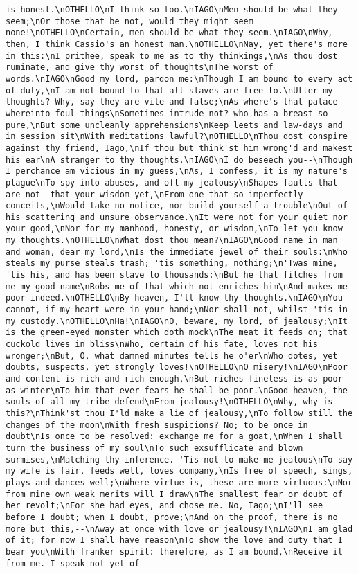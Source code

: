 \begin{verbatim}
is honest.\nOTHELLO\nI think so too.\nIAGO\nMen should be what they seem;\nOr those that be not, would they might seem none!\nOTHELLO\nCertain, men should be what they seem.\nIAGO\nWhy, then, I think Cassio's an honest man.\nOTHELLO\nNay, yet there's more in this:\nI prithee, speak to me as to thy thinkings,\nAs thou dost ruminate, and give thy worst of thoughts\nThe worst of words.\nIAGO\nGood my lord, pardon me:\nThough I am bound to every act of duty,\nI am not bound to that all slaves are free to.\nUtter my thoughts? Why, say they are vile and false;\nAs where's that palace whereinto foul things\nSometimes intrude not? who has a breast so pure,\nBut some uncleanly apprehensions\nKeep leets and law-days and in session sit\nWith meditations lawful?\nOTHELLO\nThou dost conspire against thy friend, Iago,\nIf thou but think'st him wrong'd and makest his ear\nA stranger to thy thoughts.\nIAGO\nI do beseech you--\nThough I perchance am vicious in my guess,\nAs, I confess, it is my nature's plague\nTo spy into abuses, and oft my jealousy\nShapes faults that are not--that your wisdom yet,\nFrom one that so imperfectly conceits,\nWould take no notice, nor build yourself a trouble\nOut of his scattering and unsure observance.\nIt were not for your quiet nor your good,\nNor for my manhood, honesty, or wisdom,\nTo let you know my thoughts.\nOTHELLO\nWhat dost thou mean?\nIAGO\nGood name in man and woman, dear my lord,\nIs the immediate jewel of their souls:\nWho steals my purse steals trash; 'tis something, nothing;\n'Twas mine, 'tis his, and has been slave to thousands:\nBut he that filches from me my good name\nRobs me of that which not enriches him\nAnd makes me poor indeed.\nOTHELLO\nBy heaven, I'll know thy thoughts.\nIAGO\nYou cannot, if my heart were in your hand;\nNor shall not, whilst 'tis in my custody.\nOTHELLO\nHa!\nIAGO\nO, beware, my lord, of jealousy;\nIt is the green-eyed monster which doth mock\nThe meat it feeds on; that cuckold lives in bliss\nWho, certain of his fate, loves not his wronger;\nBut, O, what damned minutes tells he o'er\nWho dotes, yet doubts, suspects, yet strongly loves!\nOTHELLO\nO misery!\nIAGO\nPoor and content is rich and rich enough,\nBut riches fineless is as poor as winter\nTo him that ever fears he shall be poor.\nGood heaven, the souls of all my tribe defend\nFrom jealousy!\nOTHELLO\nWhy, why is this?\nThink'st thou I'ld make a lie of jealousy,\nTo follow still the changes of the moon\nWith fresh suspicions? No; to be once in doubt\nIs once to be resolved: exchange me for a goat,\nWhen I shall turn the business of my soul\nTo such exsufflicate and blown surmises,\nMatching thy inference. 'Tis not to make me jealous\nTo say my wife is fair, feeds well, loves company,\nIs free of speech, sings, plays and dances well;\nWhere virtue is, these are more virtuous:\nNor from mine own weak merits will I draw\nThe smallest fear or doubt of her revolt;\nFor she had eyes, and chose me. No, Iago;\nI'll see before I doubt; when I doubt, prove;\nAnd on the proof, there is no more but this,--\nAway at once with love or jealousy!\nIAGO\nI am glad of it; for now I shall have reason\nTo show the love and duty that I bear you\nWith franker spirit: therefore, as I am bound,\nReceive it from me. I speak not yet of 
\end{verbatim}

